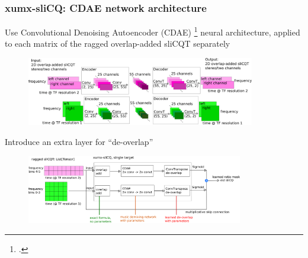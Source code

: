 \documentclass[usenames,dvipsnames]{beamer}
\begin{document}
\begin{frame}
	\frametitle{xumx-sliCQ: CDAE network architecture}
	Use Convolutional Denoising Autoencoder (CDAE) \footcite{plumbley1, plumbley2} neural architecture, applied to each matrix of the ragged overlap-added sliCQT separately
	\begin{figure}
		\vspace{-0.25em}
		\centering
		\includegraphics[height=3cm]{./images-blockdiagrams/xumx_slicq_cdae.png}
		\vspace{-0.25em}
	\end{figure}
	Introduce an extra layer for ``de-overlap''
	\begin{figure}
		\vspace{-0.25em}
		\centering
		\includegraphics[height=3cm]{./images-blockdiagrams/xumx_slicq_pertarget_largefont.png}
		\vspace{-0.25em}
	\end{figure}
\end{frame}
\end{document}
